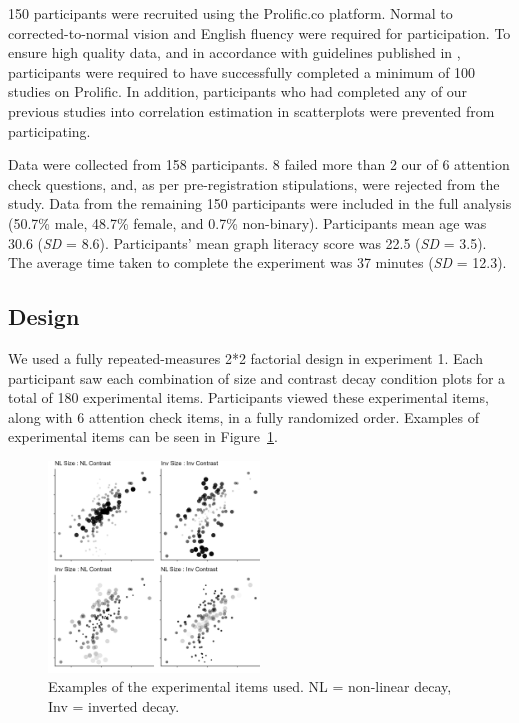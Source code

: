\documentclass[manuscript, review, anonymous, screen]{acmart}
\begin{document}
150 participants were recruited using the Prolific.co platform. Normal
to corrected-to-normal vision and English fluency were required for
participation. To ensure high quality data, and in accordance with
guidelines published in \citet{peer_2021}, participants were required to
have successfully completed a minimum of 100 studies on Prolific. In
addition, participants who had completed any of our previous studies
into correlation estimation in scatterplots \citep[and a previous
pre-study]{strain_2023, strain_2023b} were prevented from participating.

Data were collected from 158 participants. 8 failed more than 2 our of 6
attention check questions, and, as per pre-registration stipulations,
were rejected from the study. Data from the remaining 150 participants
were included in the full analysis (50.7\% male, 48.7\% female, and
0.7\% non-binary). Participants mean age was 30.6 (\emph{SD} = 8.6).
Participants' mean graph literacy score was 22.5 (\emph{SD} = 3.5). The
average time taken to complete the experiment was 37 minutes (\emph{SD}
= 12.3).

\hypertarget{sec-design}{%
\subsection{Design}\label{sec-design}}

We used a fully repeated-measures 2*2 factorial design in experiment 1.
Each participant saw each combination of size and contrast decay
condition plots for a total of 180 experimental items. Participants
viewed these experimental items, along with 6 attention check items, in
a fully randomized order. Examples of experimental items can be seen in
Figure~\ref{fig-examples}.

\begin{figure}

\includegraphics[width=0.5\textwidth,height=\textheight]{images/examples.png} \hfill{}

\caption{\label{fig-examples}Examples of the experimental items used. NL
= non-linear decay, Inv = inverted decay.}

\end{figure}
\end{document}
